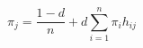
\begin{equation} 
	\label{eqn:ecuacionPageRank} 
	\pi_j = \frac{1-d}{n} + d \sum_{i=1}^{n} \pi_i h_{ij} 
\end{equation}

